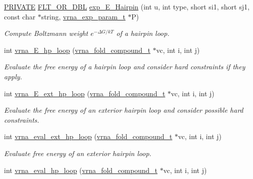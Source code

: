 \begin{DoxyCompactItemize}
\mbox{\hyperlink{group__utils_ga5e151c615eda34903514212f05a5ccf8}{P\+R\+I\+V\+A\+TE}} \mbox{\hyperlink{group__data__structures_ga31125aeace516926bf7f251f759b6126}{F\+L\+T\+\_\+\+O\+R\+\_\+\+D\+BL}} \mbox{\hyperlink{group__loops_ga51fb555974f180b78d76142b2894851c}{exp\+\_\+\+E\+\_\+\+Hairpin}} (int u, int type, short si1, short sj1, const char $\ast$string, \mbox{\hyperlink{group__energy__parameters_ga01d8b92fe734df8d79a6169482c7d8d8}{vrna\+\_\+exp\+\_\+param\+\_\+t}} $\ast$P)
\begin{DoxyCompactList}\small\item\em Compute Boltzmann weight $e^{-\Delta G/kT} $ of a hairpin loop. \end{DoxyCompactList}\item 
int \mbox{\hyperlink{group__loops_ga999ba163a8148d72fd5f22819a681df7}{vrna\+\_\+\+E\+\_\+hp\+\_\+loop}} (\mbox{\hyperlink{group__fold__compound_ga1b0cef17fd40466cef5968eaeeff6166}{vrna\+\_\+fold\+\_\+compound\+\_\+t}} $\ast$vc, int i, int j)
\begin{DoxyCompactList}\small\item\em Evaluate the free energy of a hairpin loop and consider hard constraints if they apply. \end{DoxyCompactList}\item 
int \mbox{\hyperlink{group__loops_gac3393ee309372eccae944e3a07f455f9}{vrna\+\_\+\+E\+\_\+ext\+\_\+hp\+\_\+loop}} (\mbox{\hyperlink{group__fold__compound_ga1b0cef17fd40466cef5968eaeeff6166}{vrna\+\_\+fold\+\_\+compound\+\_\+t}} $\ast$vc, int i, int j)
\begin{DoxyCompactList}\small\item\em Evaluate the free energy of an exterior hairpin loop and consider possible hard constraints. \end{DoxyCompactList}\item 
int \mbox{\hyperlink{group__loops_gad3b92453a6b501856eec8fae39f3235d}{vrna\+\_\+eval\+\_\+ext\+\_\+hp\+\_\+loop}} (\mbox{\hyperlink{group__fold__compound_ga1b0cef17fd40466cef5968eaeeff6166}{vrna\+\_\+fold\+\_\+compound\+\_\+t}} $\ast$vc, int i, int j)
\begin{DoxyCompactList}\small\item\em Evaluate free energy of an exterior hairpin loop. \end{DoxyCompactList}\item 
int \mbox{\hyperlink{group__loops_gab3eb4651dc26dc2b653a57dd340d7e68}{vrna\+\_\+eval\+\_\+hp\+\_\+loop}} (\mbox{\hyperlink{group__fold__compound_ga1b0cef17fd40466cef5968eaeeff6166}{vrna\+\_\+fold\+\_\+compound\+\_\+t}} $\ast$vc, int i, int j)

\end{DoxyCompactItemize}
